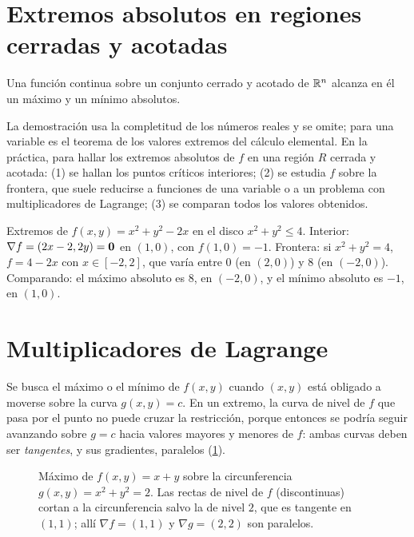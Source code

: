 \section{Extremos absolutos en regiones cerradas y acotadas}

\begin{teorema}[Weierstrass]\label{teo:weierstrass}
Una función continua sobre un conjunto cerrado y acotado de $\mathbb{R}^n$ alcanza en él un máximo y un mínimo absolutos.
\end{teorema}

La demostración usa la completitud de los números reales y se omite; para una variable es el teorema de los valores extremos del cálculo elemental. En la práctica, para hallar los extremos absolutos de $f$ en una región $R$ cerrada y acotada: (1) se hallan los puntos críticos interiores; (2) se estudia $f$ sobre la frontera, que suele reducirse a funciones de una variable o a un problema con multiplicadores de Lagrange; (3) se comparan todos los valores obtenidos.

\begin{ejemplo}\label{ej:t5-absolutos}
Extremos de $f(x,y)=x^2+y^2-2x$ en el disco $x^2+y^2\le4$. Interior: $\nabla f=(2x-2,2y)=\mathbf{0}$ en $(1,0)$, con $f(1,0)=-1$. Frontera: si $x^2+y^2=4$, $f=4-2x$ con $x\in[-2,2]$, que varía entre $0$ (en $(2,0)$) y $8$ (en $(-2,0)$). Comparando: el máximo absoluto es $8$, en $(-2,0)$, y el mínimo absoluto es $-1$, en $(1,0)$.
\end{ejemplo}

\section{Multiplicadores de Lagrange}

Se busca el máximo o el mínimo de $f(x,y)$ cuando $(x,y)$ está obligado a moverse sobre la curva $g(x,y)=c$. En un extremo, la curva de nivel de $f$ que pasa por el punto no puede cruzar la restricción, porque entonces se podría seguir avanzando sobre $g=c$ hacia valores mayores y menores de $f$: ambas curvas deben ser \emph{tangentes}, y sus gradientes, paralelos (\cref{fig:t5-lagrange}).

\begin{figure}[ht]
\centering
{}
\caption{Máximo de $f(x,y)=x+y$ sobre la circunferencia $g(x,y)=x^2+y^2=2$. Las rectas de nivel de $f$ (discontinuas) cortan a la circunferencia salvo la de nivel $2$, que es tangente en $(1,1)$; allí $\nabla f=(1,1)$ y $\nabla g=(2,2)$ son paralelos.}
\label{fig:t5-lagrange}
\end{figure}

